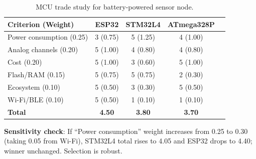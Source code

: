 \documentclass[11pt,letterpaper,twoside,openany]{book}
\begin{document}
\begin{table}[htbp]\centering\small
\begin{tabularx}{\textwidth}{l c c c c}
\toprule
\textbf{Criterion (Weight)} & \textbf{ESP32\index{ESP32}} & \textbf{STM32L4} & \textbf{ATmega328P} \\
\midrule
Power consumption (0.25) & 3 (0.75) & 5 (1.25) & 4 (1.00) \\
Analog channels (0.20) & 5 (1.00) & 4 (0.80) & 4 (0.80) \\
Cost (0.20) & 5 (1.00) & 3 (0.60) & 5 (1.00) \\
Flash/RAM (0.15) & 5 (0.75) & 5 (0.75) & 2 (0.30) \\
Ecosystem (0.10) & 5 (0.50) & 3 (0.30) & 5 (0.50) \\
Wi-Fi/BLE (0.10) & 5 (0.50) & 1 (0.10) & 1 (0.10) \\
\midrule
\textbf{Total} & \textbf{4.50} & \textbf{3.80} & \textbf{3.70} \\
\bottomrule
\end{tabularx}
\caption{MCU trade study for battery-powered sensor node.}
\end{table}

\textbf{Sensitivity check}: If ``Power consumption'' weight increases from 0.25 to 0.30 (taking 0.05 from Wi-Fi), STM32L4 total rises to 4.05 and ESP32 drops to 4.40; winner unchanged. Selection is robust.
\end{document}
